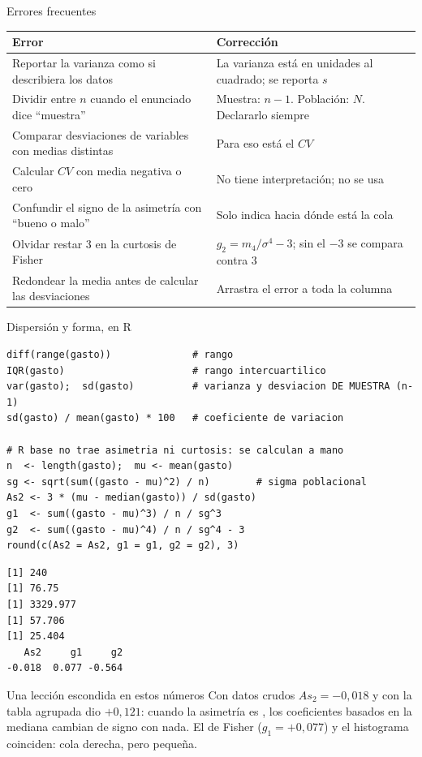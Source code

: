 \documentclass[aspectratio=169,10pt]{beamer}
\begin{document}
\begin{frame}{Errores frecuentes}
  \scriptsize
  \begin{center}
  \begin{tabular}{@{}p{5.4cm}p{6.4cm}@{}}
    \toprule
    \textbf{Error} & \textbf{Corrección} \\
    \midrule
    Reportar la varianza como si describiera los datos &
      La varianza está en unidades al cuadrado; se reporta $s$ \\
    Dividir entre $n$ cuando el enunciado dice ``muestra'' &
      Muestra: $n-1$. Población: $N$. Declararlo siempre \\
    Comparar desviaciones de variables con medias distintas &
      Para eso está el $CV$ \\
    Calcular $CV$ con media negativa o cero &
      No tiene interpretación; no se usa \\
    Confundir el signo de la asimetría con ``bueno o malo'' &
      Solo indica hacia dónde está la cola \\
    Olvidar restar 3 en la curtosis de Fisher &
      $g_2 = m_4/\sigma^4 - 3$; sin el $-3$ se compara contra 3 \\
    Redondear la media antes de calcular las desviaciones &
      Arrastra el error a toda la columna \\
    \bottomrule
  \end{tabular}
  \end{center}
\end{frame}

\begin{frame}[fragile]{Dispersión y forma, en R}
  \tiny
\begin{lstlisting}[style=Rmini]
diff(range(gasto))              # rango
IQR(gasto)                      # rango intercuartilico
var(gasto);  sd(gasto)          # varianza y desviacion DE MUESTRA (n-1)
sd(gasto) / mean(gasto) * 100   # coeficiente de variacion

# R base no trae asimetria ni curtosis: se calculan a mano
n  <- length(gasto);  mu <- mean(gasto)
sg <- sqrt(sum((gasto - mu)^2) / n)        # sigma poblacional
As2 <- 3 * (mu - median(gasto)) / sd(gasto)
g1  <- sum((gasto - mu)^3) / n / sg^3
g2  <- sum((gasto - mu)^4) / n / sg^4 - 3
round(c(As2 = As2, g1 = g1, g2 = g2), 3)
\end{lstlisting}
\begin{lstlisting}[style=Rout]
[1] 240
[1] 76.75
[1] 3329.977
[1] 57.706
[1] 25.404
   As2     g1     g2
-0.018  0.077 -0.564
\end{lstlisting}

  \vspace{-0.28cm}
  \begin{alertblock}{Una lección escondida en estos números}
    \tiny
    Con datos crudos $As_2=-0{,}018$ y con la tabla agrupada dio $+0{,}121$:
    cuando la asimetría es , los coeficientes basados en la
    mediana cambian de signo con nada. El de Fisher ($g_1=+0{,}077$) y el
    histograma coinciden: cola derecha, pero pequeña.
  \end{alertblock}
\end{frame}
\end{document}
